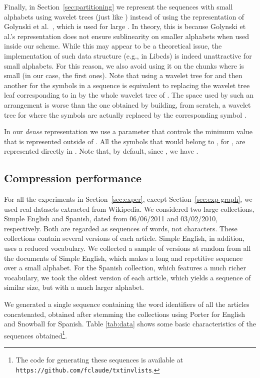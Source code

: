 \documentclass[11pt]{article}
\newcommand{\libcds}{{\sc Libcds}}
\begin{document}
\begin{table}[t]
{\begin{tabular}
Finally, in Section~\ref{sec:partitioning} we represent the sequences 
 with small alphabets  using wavelet trees (just 
like ) instead of using the representation of Golynski et al.~\cite{GMR06}, 
which is used for large . In theory, this is because
Golynski et al.'s representation does not ensure sublinearity on smaller
alphabets when used inside our scheme. While this may appear to be a theoretical
issue, the implementation of such data structure (e.g., in \libcds) is indeed 
unattractive for small alphabets. For this reason, we also avoid using it on 
the chunks where  is small (in our case, the first ones). Note 
that using a wavelet tree for  and then another for the symbols in a 
sequence  is equivalent to replacing the wavelet tree leaf 
corresponding to  in  by the whole wavelet tree of . The
space used by such an arrangement is worse than the one obtained by building,
from scratch, a wavelet tree for  where the symbols  are
actually replaced by the corresponding symbol .

In our {\em dense} representation we use a parameter  that
controls the minimum  value that is represented outside of . All 
the symbols that would belong to , for , are
represented directly in . Note that, by default, since ,
we have .

\subsection{Compression performance}
\label{sec:exp-compr}

For all the experiments in Section~\ref{sec:exper}, except 
Section~\ref{sec:exp-graph}, we used real datasets extracted from Wikipedia. 
We considered two large collections, Simple English and Spanish, dated from
06/06/2011 and 03/02/2010, respectively. Both are regarded as sequences of
words, not characters. These collections contain several versions of each
article. Simple English, in addition, uses a reduced vocabulary. We collected 
a sample of  versions at random from all the documents of Simple
English, which makes a long and repetitive sequence over a small alphabet. 
For the Spanish collection, which features a much richer vocabulary, we took 
the oldest version of each article, which yields a sequence of similar
size, but with a much larger alphabet.

We generated a single sequence containing the word identifiers of all the
articles concatenated, obtained after stemming the collections using
Porter for English and Snowball for Spanish. Table \ref{tab:data}
shows some basic characteristics of the sequences obtained\footnote{The code for generating these sequences is available at
\texttt{https://github.com/fclaude/txtinvlists}.}.


\end{tabular}}
\end{table}
\end{document}
